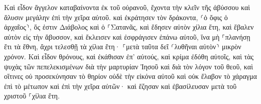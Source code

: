 \documentclass{openreader}
\begin{document}
Καὶ εἶδον ἄγγελον καταβαίνοντα ἐκ τοῦ οὐρανοῦ, ἔχοντα τὴν κλεῖν τῆς ἀβύσσου καὶ ἅλυσιν μεγάλην ἐπὶ τὴν χεῖρα αὐτοῦ. 
καὶ ἐκράτησεν τὸν δράκοντα, ⸂ὁ ὄφις ὁ ἀρχαῖος⸃, ὅς ἐστιν Διάβολος καὶ ὁ ⸀Σατανᾶς, καὶ ἔδησεν αὐτὸν χίλια ἔτη, 
καὶ ἔβαλεν αὐτὸν εἰς τὴν ἄβυσσον, καὶ ἔκλεισεν καὶ ἐσφράγισεν ἐπάνω αὐτοῦ, ἵνα μὴ ⸀πλανήσῃ ἔτι τὰ ἔθνη, ἄχρι τελεσθῇ τὰ χίλια ἔτη· ⸀μετὰ ταῦτα δεῖ ⸂λυθῆναι αὐτὸν⸃ μικρὸν χρόνον. 
Καὶ εἶδον θρόνους, καὶ ἐκάθισαν ἐπ’ αὐτούς, καὶ κρίμα ἐδόθη αὐτοῖς, καὶ τὰς ψυχὰς τῶν πεπελεκισμένων διὰ τὴν μαρτυρίαν Ἰησοῦ καὶ διὰ τὸν λόγον τοῦ θεοῦ, καὶ οἵτινες οὐ προσεκύνησαν τὸ θηρίον οὐδὲ τὴν εἰκόνα αὐτοῦ καὶ οὐκ ἔλαβον τὸ χάραγμα ἐπὶ τὸ μέτωπον καὶ ἐπὶ τὴν χεῖρα αὐτῶν· καὶ ἔζησαν καὶ ἐβασίλευσαν μετὰ τοῦ χριστοῦ ⸀χίλια ἔτη. 
\end{document}
